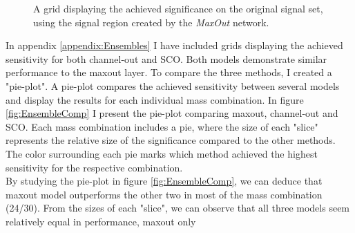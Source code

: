 \begin{figure}
    \caption{A grid displaying the achieved significance on the original signal set, using the signal region 
    created by the \emph{MaxOut} network.}
    \label{fig:MaxOutGridSig}
\end{figure}
In appendix \ref{appendix:Ensembles} I have included grids displaying the achieved sensitivity for both channel-out and \ac{SCO}. Both 
models demonstrate similar performance to the maxout layer. To compare the three methods, I created a "pie-plot". A pie-plot 
compares the achieved sensitivity between several models and display the results for each individual mass combination.  In figure 
\ref{fig:EnsembleComp} I present the pie-plot comparing maxout, channel-out and \ac{SCO}. Each mass combination includes a pie, where 
the size of each "slice" represents the relative size of the significance compared to the other methods. The color surrounding each 
pie marks which method achieved the highest sensitivity for the respective combination.
\\
By studying the pie-plot in figure \ref{fig:EnsembleComp}, we can deduce that maxout model outperforms the other two in most of the mass 
combination (24/30). From the sizes of each "slice", we can observe that all three models seem relatively equal in performance, maxout only 
